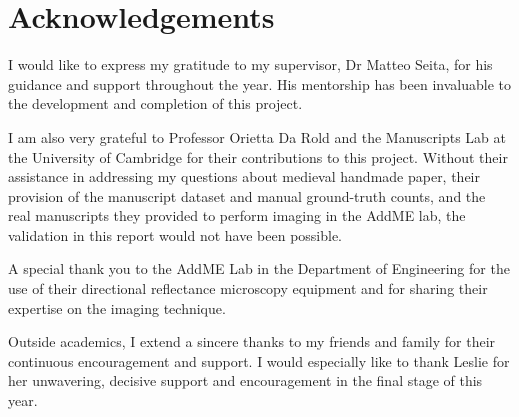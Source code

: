 
\section*{Acknowledgements}

I would like to express my gratitude to my supervisor, Dr Matteo
Seita, for his guidance and support throughout the year. His
mentorship has been invaluable to the development and completion of
this project.

I am also very grateful to Professor Orietta Da Rold and the
Manuscripts Lab at the University of Cambridge for their contributions
to this project. Without their assistance in addressing my questions
about medieval handmade paper, their provision of the manuscript
dataset and manual ground-truth counts, and the real manuscripts they provided to
perform imaging in the AddME lab, the validation in this report
would not have been possible.

A special thank you to the AddME Lab in the Department of Engineering
for the use of their directional reflectance microscopy equipment and
for sharing their expertise on the imaging technique.

Outside academics, I extend a sincere thanks to my friends and family for their
continuous encouragement and support. I would especially like to thank Leslie for
 her unwavering, decisive support and encouragement in the final stage of this year.

\newpage
